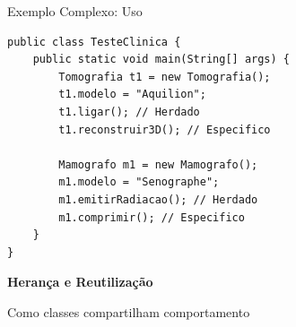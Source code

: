 \documentclass[9pt]{beamer}
\begin{document}
\begin{frame}[fragile]{Exemplo Complexo: Uso}
\begin{lstlisting}
public class TesteClinica {
    public static void main(String[] args) {
        Tomografia t1 = new Tomografia();
        t1.modelo = "Aquilion";
        t1.ligar(); // Herdado
        t1.reconstruir3D(); // Especifico

        Mamografo m1 = new Mamografo();
        m1.modelo = "Senographe";
        m1.emitirRadiacao(); // Herdado
        m1.comprimir(); // Especifico
    }
}
\end{lstlisting}
\end{frame}
\begin{frame}
\centering

\vspace{1cm}

{\Huge \textbf{Herança e Reutilização}}

\vspace{0.8cm}

{\large Como classes compartilham comportamento}

\vspace{1.5cm}


\vfill

\end{frame}
\end{document}
